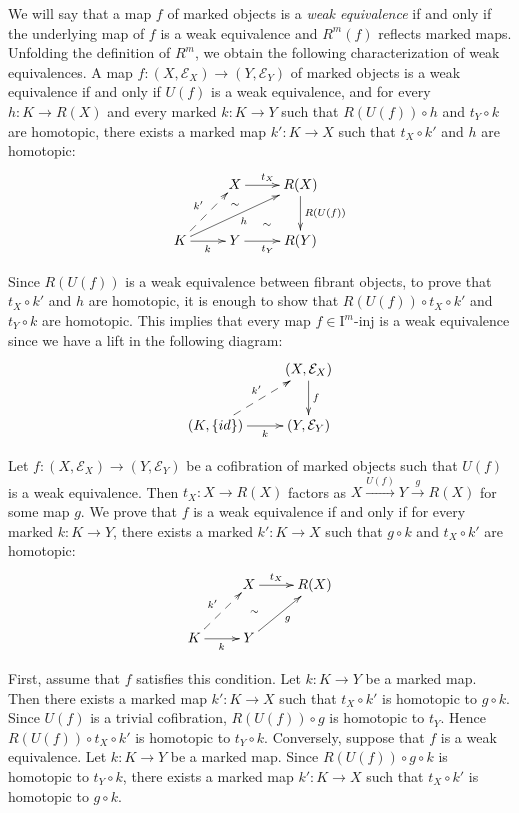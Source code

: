 \documentclass[reqno]{amsart}
\theoremstyle{definition}
\theoremstyle{remark}
\newcommand{\I}{\mathrm{I}}
\newcommand{\class}[2]{#1\text{-}\mathrm{#2}}
\newcommand{\Iinj}[1][\I]{\class{#1}{inj}}
\numberwithin{figure}{section}
\begin{document}
We will say that a map $f$ of marked objects is a \emph{weak equivalence}
if and only if the underlying map of $f$ is a weak equivalence and $R^m(f)$ reflects marked maps.
Unfolding the definition of $R^m$, we obtain the following characterization of weak equivalences.
A map $f : (X,\mathcal{E}_X) \to (Y,\mathcal{E}_Y)$ of marked objects is a weak equivalence if and only if $U(f)$ is a weak equivalence,
and for every $h : K \to R(X)$ and every marked $k : K \to Y$ such that $R(U(f)) \circ h$ and $t_{Y} \circ k$ are homotopic,
there exists a marked map $k' : K \to X$ such that $t_X \circ k'$ and $h$ are homotopic:
\[ \xymatrix{                                          & X \ar[r]^{t_X} \ar@{}[d]|(.35){\sim} \ar@{}[dr]_(.6){\sim} & R(X) \ar[d]^{R(U(f))} \\
              K \ar[r]_k \ar[urr]_h \ar@{-->}[ur]^{k'} & Y \ar[r]_{t_Y}                                             & R(Y)
            } \]

Since $R(U(f))$ is a weak equivalence between fibrant objects, to prove that $t_X \circ k'$ and $h$ are homotopic,
it is enough to show that $R(U(f)) \circ t_X \circ k'$ and $t_Y \circ k$ are homotopic.
This implies that every map $f \in \Iinj[\I^m]$ is a weak equivalence since we have a lift in the following diagram:
\[ \xymatrix{                                         & (X,\mathcal{E}_X) \ar[d]^f \\
              (K,\{id\}) \ar[r]_-k \ar@{-->}[ur]^{k'} & (Y,\mathcal{E}_Y)
            } \]

Let $f : (X,\mathcal{E}_X) \to (Y,\mathcal{E}_Y)$ be a cofibration of marked objects such that $U(f)$ is a weak equivalence.
Then $t_X : X \to R(X)$ factors as $X \xrightarrow{U(f)} Y \xrightarrow{g} R(X)$ for some map $g$.
We prove that $f$ is a weak equivalence if and only if for every marked $k : K \to Y$, there exists a marked $k' : K \to X$ such that $g \circ k$ and $t_X \circ k'$ are homotopic:
\[ \xymatrix{                                                  & X \ar[r]^-{t_X} & R(X) \\
              K \ar[r]_k \ar@{-->}[ur]^{k'} \ar@{}[urr]|{\sim} & Y \ar[ur]_g
            } \]

First, assume that $f$ satisfies this condition.
Let $k : K \to Y$ be a marked map.
Then there exists a marked map $k' : K \to X$ such that $t_X \circ k'$ is homotopic to $g \circ k$.
Since $U(f)$ is a trivial cofibration, $R(U(f)) \circ g$ is homotopic to $t_Y$.
Hence $R(U(f)) \circ t_X \circ k'$ is homotopic to $t_Y \circ k$.
Conversely, suppose that $f$ is a weak equivalence.
Let $k : K \to Y$ be a marked map.
Since $R(U(f)) \circ g \circ k$ is homotopic to $t_Y \circ k$, there exists a marked map $k' : K \to X$ such that $t_X \circ k'$ is homotopic to $g \circ k$.
\end{document}
